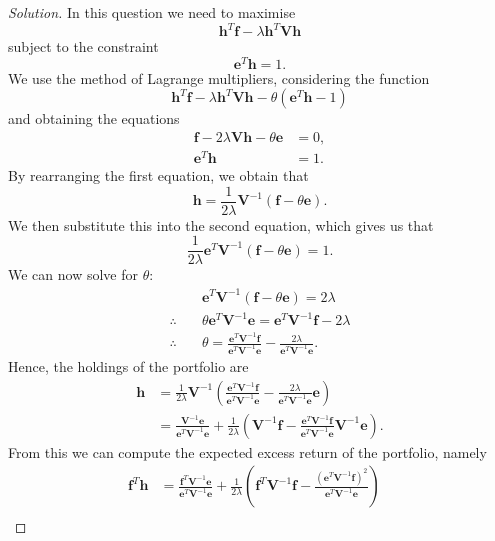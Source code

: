\begin{proof}[Solution]
In this question we need to maximise \[\mathbf{h}^{T}\mathbf{f} - \lambda\mathbf{h}^{T}\mathbf{V}\mathbf{h}\] subject to the constraint \[\mathbf{e}^{T}\mathbf{h} = 1.\] We use the method of Lagrange multipliers, considering the function \[\mathbf{h}^{T}\mathbf{f} - \lambda\mathbf{h}^{T}\mathbf{V}\mathbf{h} - \theta(\mathbf{e}^{T}\mathbf{h} - 1)\] and obtaining the equations
\begin{align*}
\mathbf{f} - 2\lambda\mathbf{V}\mathbf{h} - \theta\mathbf{e} &= 0, \\
\mathbf{e}^{T}\mathbf{h} &= 1.
\end{align*}
By rearranging the first equation, we obtain that \[\mathbf{h} = \frac{1}{2\lambda}\mathbf{V}^{-1}(\mathbf{f} - \theta\mathbf{e}).\] We then substitute this into the second equation, which gives us that \[\frac{1}{2\lambda}\mathbf{e}^{T}\mathbf{V}^{-1}(\mathbf{f} - \theta\mathbf{e}) = 1.\] We can now solve for $\theta$:
\begin{align*}
&\mathbf{e}^{T}\mathbf{V}^{-1}(\mathbf{f} - \theta\mathbf{e}) = 2\lambda \\
\therefore \quad &\theta\mathbf{e}^{T}\mathbf{V}^{-1}\mathbf{e} = \mathbf{e}^{T}\mathbf{V}^{-1}\mathbf{f} - 2\lambda \\
\therefore \quad &\theta = \frac{\mathbf{e}^{T}\mathbf{V}^{-1}\mathbf{f}}{\mathbf{e}^{T}\mathbf{V}^{-1}\mathbf{e}} - \frac{2\lambda}{\mathbf{e}^{T}\mathbf{V}^{-1}\mathbf{e}}.
\end{align*}
Hence, the holdings of the portfolio are
\begin{align*}
\mathbf{h} &= \frac{1}{2\lambda}\mathbf{V}^{-1}\left(\frac{\mathbf{e}^{T}\mathbf{V}^{-1}\mathbf{f}}{\mathbf{e}^{T}\mathbf{V}^{-1}\mathbf{e}} - \frac{2\lambda}{\mathbf{e}^{T}\mathbf{V}^{-1}\mathbf{e}}\mathbf{e}\right)\\
&= \frac{\mathbf{V}^{-1}\mathbf{e}}{\mathbf{e}^{T}\mathbf{V}^{-1}\mathbf{e}} + \frac{1}{2\lambda}\left(\mathbf{V}^{-1}\mathbf{f} - \frac{\mathbf{e}^{T}\mathbf{V}^{-1}\mathbf{f}}{\mathbf{e}^{T}\mathbf{V}^{-1}\mathbf{e}}\mathbf{V}^{-1}\mathbf{e}\right).
\end{align*}
From this we can compute the expected excess return of the portfolio, namely
\begin{align*}
\mathbf{f}^{T}\mathbf{h} &= \frac{\mathbf{f}^{T}\mathbf{V}^{-1}\mathbf{e}}{\mathbf{e}^{T}\mathbf{V}^{-1}\mathbf{e}} + \frac{1}{2\lambda}\left(\mathbf{f}^{T}\mathbf{V}^{-1}\mathbf{f} - \frac{(\mathbf{e}^{T}\mathbf{V}^{-1}\mathbf{f})^{2}}{\mathbf{e}^{T}\mathbf{V}^{-1}\mathbf{e}}\right) & \\

\end{align*}
\end{proof}
